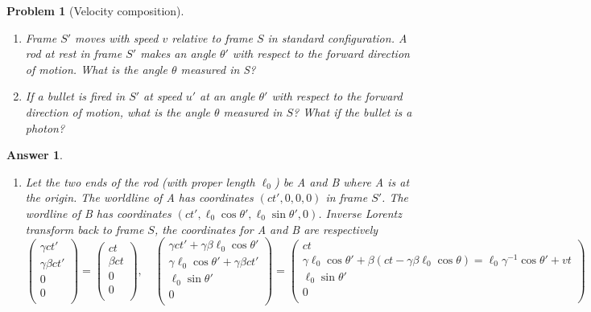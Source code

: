 \documentclass[a4paper]{article}
\newtheorem{ans}{Answer}[subsection]
\theoremstyle{new}
\newtheorem{qns}{Problem}[section]
\begin{document}
\newpage
\begin{qns}[Velocity composition]\leavevmode
\begin{enumerate}[label=(\alph*)]
\item Frame $S'$ moves with speed $v$ relative to frame $S$ in standard configuration. A rod at rest in frame $S'$ makes an angle $\theta'$ with respect to the forward direction of motion. What is the angle $\theta$ measured in S?
\item If a bullet is fired in $S'$ at speed $u'$ at an angle $\theta'$ with respect to the forward direction of motion, what is the angle $\theta$ measured in $S$? What if the bullet is a photon?
\end{enumerate}
\end{qns}
\begin{ans}\leavevmode
\begin{enumerate}[label=(\alph*)]
\item Let the two ends of the rod (with proper length $\ell_0$) be A and B where A is at the origin. The worldline of A has coordinates $(ct',0,0,0)$ in frame $S'$. The wordline of B has coordinates $(ct',\ell_0\cos\theta',\ell_0\sin\theta',0)$. Inverse Lorentz transform back to frame $S$, the coordinates for A and B are respectively
$$\begin{pmatrix}\gamma ct'\\\gamma\beta ct'\\0\\0\\\end{pmatrix}=\begin{pmatrix}ct\\\beta ct\\0\\0\\\end{pmatrix},\quad\begin{pmatrix}\gamma ct'+\gamma\beta\ell_0\cos\theta'\\\gamma\ell_0\cos\theta'+\gamma\beta ct'\\\ell_0\sin\theta'\\0\\\end{pmatrix}=\begin{pmatrix}ct\\\gamma\ell_0\cos\theta'+\beta(ct-\gamma\beta\ell_0\cos\theta)=\ell_0\gamma^{-1}\cos\theta'+vt\\\ell_0\sin\theta'\\0\\\end{pmatrix}$$

\end{enumerate}
\end{ans}
\end{document}
